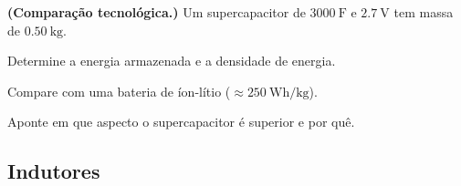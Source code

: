 \begin{questao}[4]{}

\textbf{(Comparação tecnológica.)} Um supercapacitor de $\SI{3000}{\farad}$ e
$\SI{2.7}{\volt}$ tem massa de $\SI{0.50}{\kilogram}$.
\begin{itensq}
\item Determine a energia armazenada e a densidade de energia.
\item Compare com uma bateria de íon-lítio ($\approx\SI{250}{\watt\hour\per\kilogram}$).
\item Aponte em que aspecto o supercapacitor é superior e por quê.
\end{itensq}


\end{questao}

\gabarito[10.1 Capacitores]

\subsection{Indutores}


